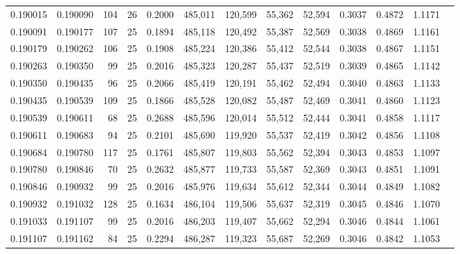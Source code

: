 \begin{tabular}{rrrrrrrrrrrrr}
0.190015 & 0.190090 &   104 &  26 &                                     0.2000 & 485,011 & 120,599 &  55,362 &  52,594 & 0.3037 & 0.4872 & 1.1171 \\
0.190091 & 0.190177 &   107 &  25 &                                     0.1894 & 485,118 & 120,492 &  55,387 &  52,569 & 0.3038 & 0.4869 & 1.1161 \\
0.190179 & 0.190262 &   106 &  25 &                                     0.1908 & 485,224 & 120,386 &  55,412 &  52,544 & 0.3038 & 0.4867 & 1.1151 \\
0.190263 & 0.190350 &    99 &  25 &                                     0.2016 & 485,323 & 120,287 &  55,437 &  52,519 & 0.3039 & 0.4865 & 1.1142 \\
0.190350 & 0.190435 &    96 &  25 &                                     0.2066 & 485,419 & 120,191 &  55,462 &  52,494 & 0.3040 & 0.4863 & 1.1133 \\
0.190435 & 0.190539 &   109 &  25 &                                     0.1866 & 485,528 & 120,082 &  55,487 &  52,469 & 0.3041 & 0.4860 & 1.1123 \\
0.190539 & 0.190611 &    68 &  25 &                                     0.2688 & 485,596 & 120,014 &  55,512 &  52,444 & 0.3041 & 0.4858 & 1.1117 \\
0.190611 & 0.190683 &    94 &  25 &                                     0.2101 & 485,690 & 119,920 &  55,537 &  52,419 & 0.3042 & 0.4856 & 1.1108 \\
0.190684 & 0.190780 &   117 &  25 &                                     0.1761 & 485,807 & 119,803 &  55,562 &  52,394 & 0.3043 & 0.4853 & 1.1097 \\
0.190780 & 0.190846 &    70 &  25 &                                     0.2632 & 485,877 & 119,733 &  55,587 &  52,369 & 0.3043 & 0.4851 & 1.1091 \\
0.190846 & 0.190932 &    99 &  25 &                                     0.2016 & 485,976 & 119,634 &  55,612 &  52,344 & 0.3044 & 0.4849 & 1.1082 \\
0.190932 & 0.191032 &   128 &  25 &                                     0.1634 & 486,104 & 119,506 &  55,637 &  52,319 & 0.3045 & 0.4846 & 1.1070 \\
0.191033 & 0.191107 &    99 &  25 &                                     0.2016 & 486,203 & 119,407 &  55,662 &  52,294 & 0.3046 & 0.4844 & 1.1061 \\
0.191107 & 0.191162 &    84 &  25 &                                     0.2294 & 486,287 & 119,323 &  55,687 &  52,269 & 0.3046 & 0.4842 & 1.1053 \\

\end{tabular}
